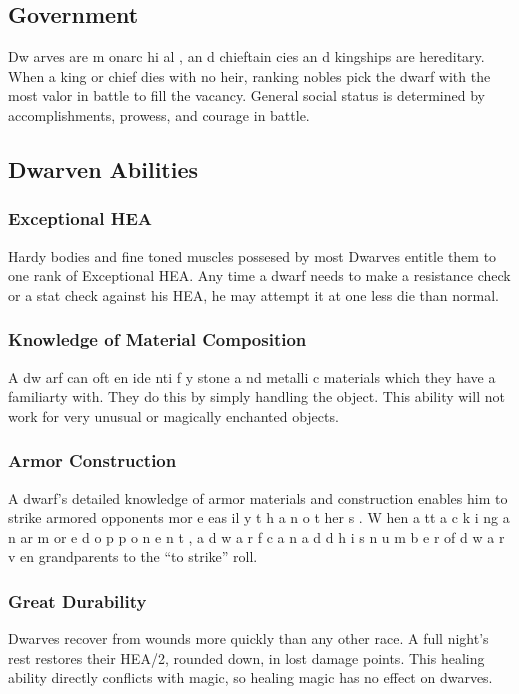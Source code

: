 \begin{multicols*}{2}
\subsection{Government}
Dw arves are m onarc hi al , an d chieftain cies an d
kingships are hereditary. When a king or chief dies with no
heir, ranking nobles pick the dwarf with the most valor in
battle to fill the vacancy. General social status is determined
by accomplishments, prowess, and courage in battle.
\subsection{Dwarven Abilities}
\subsubsection{Exceptional HEA}
Hardy bodies and fine toned muscles possesed by
most Dwarves entitle them to one rank of Exceptional HEA.
Any time a dwarf needs to make a resistance check or a stat
check against his HEA, he may attempt it at one less die than
normal.
\subsubsection{Knowledge of Material Composition}
A dw arf can oft en ide nti f y stone a nd metalli c
materials which they have a familiarty with. They do this by
simply handling the object. This ability will not work for very
unusual or magically enchanted objects.
\subsubsection{Armor Construction}
A dwarf’s detailed knowledge of armor materials
and construction enables him to strike armored opponents
mor e eas il y t h a n o t her s . W hen a tt a c k i ng a n ar m or e d
o p p o n e n t , a d w a r f c a n a d d h i s n u m b e r of d w a r v en
grandparents to the “to strike” roll.
\subsubsection{Great Durability}
Dwarves recover from wounds more quickly than
any other race. A full night’s rest restores their HEA/2,
rounded down, in lost damage points. This healing ability
directly conflicts with magic, so healing magic has no effect
on dwarves.

\end{multicols*}
